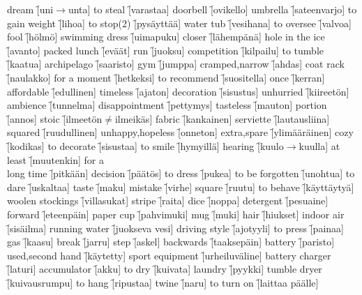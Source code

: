 \begin{questions}
\begin{multicols}{3}
    \question dream \f[uni$\rightarrow$unta]
    \question to steal \f[varastaa]
    \question doorbell \f[ovikello]
    \question umbrella \f[sateenvarjo]
    \question to gain weight \f[lihoa]
    \question to stop(2) \f[pysäyttää]
    \question water tub \f[vesihana]
    \question to oversee \f[valvoa]
    \question fool \f[hölmö]
    \question swimming dress \f[uimapuku]
    \question closer \f[lähempänä]
    \question hole in the ice \f[avanto]
    \question packed lunch \f[eväät]
    \question run \f[juoksu]
    \question competition \f[kilpailu]
    \question to tumble \f[kaatua]
    \question archipelago \f[saaristo]
    \question gym \f[jumppa]
    \question cramped,narrow \f[ahdas]
    \question coat rack \f[naulakko]
    \question for a moment \f[hetkeksi]
    \question to recommend \f[suositella]
    \question once \f[kerran]
    \question affordable \f[edullinen]
    \question timeless \f[ajaton]
    \question decoration \f[sisustus]
    \question unhurried \f[kiireetön]
    \question ambience \f[tunnelma]
    \question disappointment \f[pettymys]
    \question tasteless \f[mauton]
    \question portion \f[annos]
    \question stoic \f[ilmeetön$\neq$ilmeikäs]
    \question fabric \f[kankainen]
    \question serviette \f[lautausliina]
    \question squared \f[ruudullinen]
    \question unhappy,hopeless \f[onneton]
    \question extra,spare \f[ylimääräinen]
    \question cozy \f[kodikas]
    \question to decorate \f[sisustaa]
    \question to smile \f[hymyillä]
    \question hearing \f[kuulo$\rightarrow$kuulla]
    \question at least \f[muutenkin]
    \question for a\\long time \f[pitkään]
    \question decision \f[päätös]
    \question to dress \f[pukea]
    \question to be forgotten \f[unohtua]
    \question to dare \f[uskaltaa]
    \question taste \f[maku]
    \question mistake \f[virhe]
    \question square \f[ruutu]
    \question to behave \f[käyttäytyä]
    \question woolen stockings \f[villasukat]
    \question stripe \f[raita]
    \question dice \f[noppa]
    \question detergent \f[pesuaine]
    \question forward \f[eteenpäin]
    \question paper cup \f[pahvimuki]
    \question mug \f[muki]
    \question hair \f[hiukset]
    \question indoor air \f[sisäilma]
    \question running water \f[juokseva vesi]
    \question driving style \f[ajotyyli]
    \question to press \f[painaa]
    \question gas \f[kaasu]
    \question break \f[jarru]
    \question step \f[askel]
    \question backwards \f[taaksepäin]
    \question battery \f[paristo]
    \question used,second hand \f[käytetty]
    \question sport equipment \f[urheiluväline]
    \question battery charger \f[laturi]
    \question accumulator \f[akku]
    \question to dry \f[kuivata]
    \question laundry \f[pyykki]
    \question tumble dryer \f[kuivausrumpu]
    \question to hang \f[ripustaa]
    \question twine \f[naru]
    \question to turn on \f[laittaa päälle]
  \end{multicols}
\end{questions}
